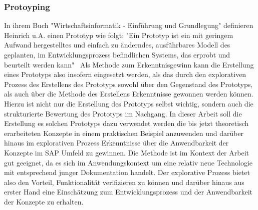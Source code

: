 \subsubsection*{Protoyping}
\label{Protoyping}
In ihrem Buch "Wirtschaftsinformatik - Einführung und Grundlegung" definieren Heinrich u.A. einen Prototyp wie folgt: "Ein Prototyp ist ein mit geringem Aufwand hergestelltes und einfach zu änderndes, ausführbares Modell des geplanten, im Entwicklungsprozess befindlichen Systems, das erprobt und beurteilt werden kann"\ \cite[S. 114]{heinrich2007wirtschaftsinformatik}
Als Methode zum Erkenntnisgewinn kann die Erstellung eines Prototyps also insofern eingesetzt werden, als das durch den explorativen Prozess des Erstellens des Prototyps sowohl über den Gegenstand des Prototyps, als auch über die Methode des Erstellens Erkenntnisse gewonnen werden können. Hierzu ist nicht nur die Erstellung des Prototyps selbst wichtig, sondern auch die strukturierte Bewertung des Prototyps im Nachgang. \cite[S. 119]{heinrich2007wirtschaftsinformatik} In dieser Arbeit soll die Erstellung es solchen Prototyps dazu verwendet werden die bis jetzt theoretisch erarbeiteten Konzepte in einem praktischen Beispiel anzuwenden und darüber hinaus im explorativen Prozess Erkenntnisse über die Anwendbarkeit der Konzepte im SAP Umfeld zu gewinnen. Die Methode ist im Kontext der Arbeit gut geeignet, da es sich im Anwendungskontext um eine relativ neue Technologie mit entsprechend junger Dokumentation handelt. Der explorative Prozess bietet also den Vorteil, Funktionalität verifizieren zu können und darüber hinaus aus erster Hand eine Einschätzung zum Entwicklungsprozess und der Anwendbarkeit der Konzepte zu erhalten.

